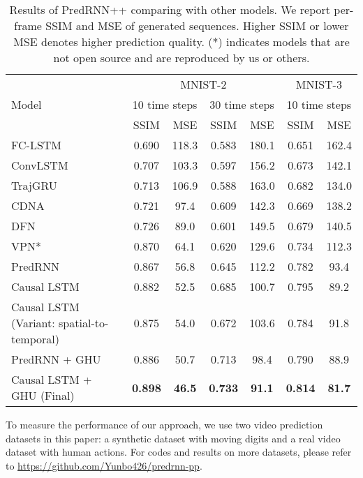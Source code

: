 \documentclass{article}
\begin{document}
\begin{table*}[tb]
\caption{Results of PredRNN++ comparing with other models. We report per-frame SSIM and MSE of generated sequences. Higher SSIM or lower MSE denotes higher prediction quality. (*) indicates models that are not open source and are reproduced by us or others.}
\label{tab:mnist_mse}
\vskip 0.15in
\centering
\begin{small}
\begin{sc}
\renewcommand{\multirowsetup}{\centering}  
\begin{tabular}{lcccccc}
\toprule
\multirow{3}{0cm}{Model} & \multicolumn{4}{c}{MNIST-2} & \multicolumn{2}{c}{MNIST-3} \\
& \multicolumn{2}{c}{10 time steps} & \multicolumn{2}{c}{30 time steps} & \multicolumn{2}{c}{10 time steps} \\
& SSIM & MSE & SSIM & MSE & SSIM & MSE  \\
\midrule
FC-LSTM \cite{srivastava2015unsupervised} & 0.690 & 118.3 &  0.583 & 180.1 & 0.651 & 162.4\\
ConvLSTM \cite{shi2015convolutional} & 0.707 & 103.3 & 0.597 & 156.2 & 0.673 &142.1 \\
TrajGRU \cite{shi2017deep} & 0.713 & 106.9 & 0.588 & 163.0 & 0.682 & 134.0 \\
CDNA \cite{Finn2016Unsupervised} & 0.721 & 97.4 & 0.609 & 142.3 & 0.669 &138.2 \\
DFN \cite{de2016dynamic} & 0.726 & 89.0 & 0.601 & 149.5 & 0.679 & 140.5 \\
VPN* \cite{Kalchbrenner2016Video} & 0.870 & 64.1 & 0.620 & 129.6 & 0.734 & 112.3 \\
PredRNN \cite{wang2017predrnn} & 0.867 & 56.8 & 0.645 & 112.2 & 0.782 & 93.4 \\
\midrule
Causal LSTM & 0.882 & 52.5 & 0.685 & 100.7 & 0.795 & 89.2  \\
Causal LSTM (Variant: spatial-to-temporal) & 0.875 & 54.0 & 0.672 & 103.6 & 0.784 & 91.8 \\
PredRNN + GHU & 0.886 & 50.7 & 0.713 & 98.4 & 0.790 & 88.9 \\
Causal LSTM + GHU (Final) & \textbf{0.898} & \textbf{46.5} & \textbf{0.733} & \textbf{91.1} & \textbf{0.814} & \textbf{81.7} \\
\bottomrule
\end{tabular}
\end{sc}
\end{small}
\end{table*}

To measure the performance of our approach, we use two video prediction datasets in this paper: a synthetic dataset with moving digits and a real video dataset with human actions. For codes and results on more datasets, please refer to \url{https://github.com/Yunbo426/predrnn-pp}. 
\end{document}
